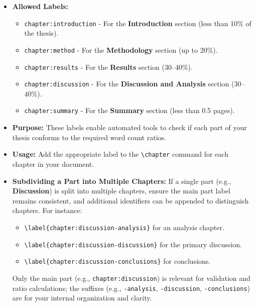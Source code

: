 \begin{itemize}
    \item \textbf{Allowed Labels:}
        \begin{itemize}
            \item \texttt{chapter:introduction} - For the \textbf{Introduction} section (less than 10\% of the thesis).
            \item \texttt{chapter:method} - For the \textbf{Methodology} section (up to 20\%).
            \item \texttt{chapter:results} - For the \textbf{Results} section (30–40\%).
            \item \texttt{chapter:discussion} - For the \textbf{Discussion and Analysis} section (30–40\%).
            \item \texttt{chapter:summary} - For the \textbf{Summary} section (less than 0.5 pages).
        \end{itemize}
    \item \textbf{Purpose:} These labels enable automated tools to check if each part of your thesis conforms to the required word count ratios.
    \item \textbf{Usage:} Add the appropriate label to the \texttt{\textbackslash chapter} command for each chapter in your document.
    \item \textbf{Subdividing a Part into Multiple Chapters:} If a single part (e.g., \textbf{Discussion}) is split into multiple chapters, ensure the main part label remains consistent, and additional identifiers can be appended to distinguish chapters. For instance:
        \begin{itemize}
            \item \texttt{\textbackslash label\{chapter:discussion-analysis\}} for an analysis chapter.
            \item \texttt{\textbackslash label\{chapter:discussion-discussion\}} for the primary discussion.
            \item \texttt{\textbackslash label\{chapter:discussion-conclusions\}} for conclusions.
        \end{itemize}
        Only the main part (e.g., \texttt{chapter:discussion}) is relevant for validation and ratio calculations; the suffixes (e.g., \texttt{-analysis}, \texttt{-discussion}, \texttt{-conclusions}) are for your internal organization and clarity.
\end{itemize}


